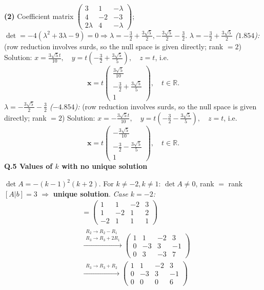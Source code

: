 \noindent\textbf{(2)} Coefficient matrix $\begin{pmatrix}3&1&-\lambda\\4&-2&-3\\2\lambda&4&-\lambda\end{pmatrix}$; $\det=- 4 \left(\lambda^{2} + 3 \lambda - 9\right)=0\Rightarrow\lambda=- \frac{3}{2} + \frac{3 \sqrt{5}}{2}, - \frac{3 \sqrt{5}}{2} - \frac{3}{2}$.
\noindent\emph{$\lambda=- \frac{3}{2} + \frac{3 \sqrt{5}}{2}$ ($1.854$):} (row reduction involves surds, so the null space is given directly; rank $=2$)
Solution: $x=\frac{3 \sqrt{5} t}{10}, \quad y=t \left(- \frac{3}{2} + \frac{3 \sqrt{5}}{5}\right), \quad z=t$, i.e. \[ \mathbf{x}=t\begin{pmatrix}\frac{3 \sqrt{5}}{10} \\ - \frac{3}{2} + \frac{3 \sqrt{5}}{5} \\ 1\end{pmatrix}, \quad t\in\mathbb{R}. \]
\noindent\emph{$\lambda=- \frac{3 \sqrt{5}}{2} - \frac{3}{2}$ ($-4.854$):} (row reduction involves surds, so the null space is given directly; rank $=2$)
Solution: $x=- \frac{3 \sqrt{5} t}{10}, \quad y=t \left(- \frac{3}{2} - \frac{3 \sqrt{5}}{5}\right), \quad z=t$, i.e. \[ \mathbf{x}=t\begin{pmatrix}- \frac{3 \sqrt{5}}{10} \\ - \frac{3}{2} - \frac{3 \sqrt{5}}{5} \\ 1\end{pmatrix}, \quad t\in\mathbb{R}. \]
\medskip\noindent\textbf{Q.5  Values of $k$ with no unique solution}\par\smallskip
$\det A=- \left(k - 1\right)^{2} \left(k + 2\right)$.
For $k\ne -2 , k\ne 1$: $\det A\neq0$, rank $=$ rank$[A|b]=3$ $\Rightarrow$ \textbf{unique solution}.
\noindent\emph{Case $k=-2$:}
\begin{align*}
[A|b] &= \left(\begin{array}{ccc|c}1 & 1 & -2 & 3 \\ 1 & -2 & 1 & 2 \\ -2 & 1 & 1 & 1\end{array}\right) \\
&\xrightarrow{\substack{R_2\to R_2-R_1\\ R_3\to R_3+2R_1}} \left(\begin{array}{ccc|c}1 & 1 & -2 & 3 \\ 0 & -3 & 3 & -1 \\ 0 & 3 & -3 & 7\end{array}\right) \\
&\xrightarrow{\substack{R_3\to R_3+R_2}} \left(\begin{array}{ccc|c}1 & 1 & -2 & 3 \\ 0 & -3 & 3 & -1 \\ 0 & 0 & 0 & 6\end{array}\right)
\end{align*}
